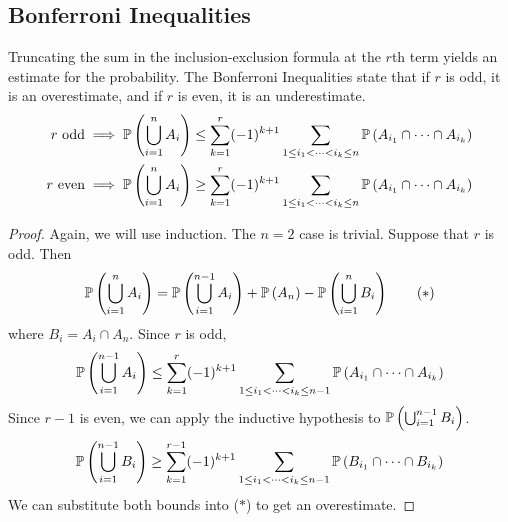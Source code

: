\subsection{Bonferroni Inequalities}
Truncating the sum in the inclusion-exclusion formula at the \(r\)th term yields an estimate for the probability.
The Bonferroni Inequalities state that if \(r\) is odd, it is an overestimate, and if \(r\) is even, it is an underestimate.
\begin{align*}
	r \text{ odd}  & \implies \mathbb{P}\left({\bigcup_{i=1}^n A_i}\right) \leq \sum_{k=1}^r (-1)^{k+1} \sum_{1 \leq i_1 < \dots < i_k \leq n} \mathbb{P}\left({A_{i_1} \cap \dots \cap A_{i_k}}\right) \\
	r \text{ even} & \implies \mathbb{P}\left({\bigcup_{i=1}^n A_i}\right) \geq \sum_{k=1}^r (-1)^{k+1} \sum_{1 \leq i_1 < \dots < i_k \leq n} \mathbb{P}\left({A_{i_1} \cap \dots \cap A_{i_k}}\right)
\end{align*}
\begin{proof}
	Again, we will use induction.
	The \(n=2\) case is trivial.
	Suppose that \(r\) is odd.
	Then
	\begin{equation}
		\mathbb{P}\left({\bigcup_{i=1}^n A_i}\right) = \mathbb{P}\left({\bigcup_{i=1}^{n-1} A_i}\right) + \mathbb{P}\left({A_n}\right) - \mathbb{P}\left({\bigcup_{i=1}^n B_i}\right) \tag{\(\ast\)}
	\end{equation}
	where \(B_i = A_i \cap A_n\).
	Since \(r\) is odd,
	\[
		\mathbb{P}\left({\bigcup_{i=1}^{n-1} A_i}\right) \leq \sum_{k=1}^r (-1)^{k+1} \sum_{1 \leq i_1 < \dots < i_k \leq n-1} \mathbb{P}\left({A_{i_1} \cap \dots \cap A_{i_k}}\right)
	\]
	Since \(r-1\) is even, we can apply the inductive hypothesis to \(\mathbb{P}\left({\bigcup_{i=1}^{n-1} B_i}\right)\).
	\[
		\mathbb{P}\left({\bigcup_{i=1}^{n-1} B_i}\right) \geq \sum_{k=1}^{r-1} (-1)^{k+1} \sum_{1 \leq i_1 < \dots < i_k \leq n-1} \mathbb{P}\left({B_{i_1} \cap \dots \cap B_{i_k}}\right)
	\]
	We can substitute both bounds into (\(\ast\)) to get an overestimate.
\end{proof}

